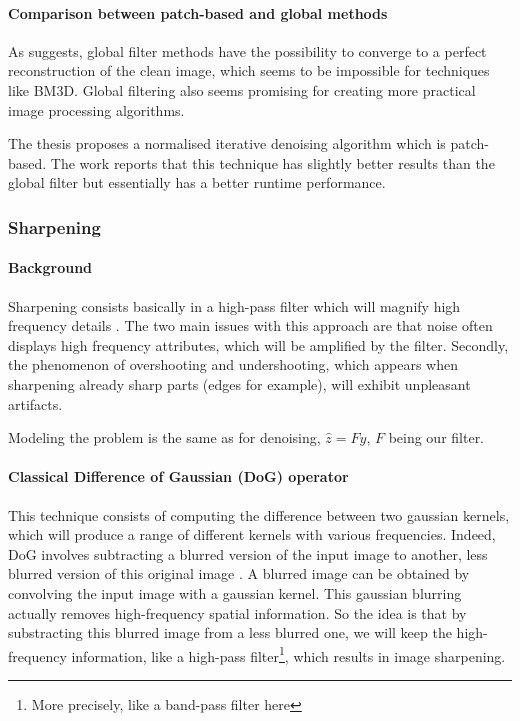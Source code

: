 \paragraph{Comparison between patch-based and global methods}
As \cite{talebi_asymptotic_2016} suggests, global filter methods have the possibility to converge to a perfect reconstruction of the clean image, which seems to be impossible for techniques like BM3D.
Global filtering also seems promising for creating more practical image processing algorithms.

The thesis \cite{kheradmand_graph-based_2016} proposes a normalised iterative denoising algorithm which is patch-based.
The work reports that this technique has slightly better results than the global filter but essentially has a better runtime performance.

\subsubsection{Sharpening}

\paragraph{Background}
Sharpening consists basically in a high-pass filter which will magnify high frequency details \cite{kheradmand_graph-based_2016}.
The two main issues with this approach are that noise often displays high frequency attributes, which will be amplified by the filter.
Secondly, the phenomenon of overshooting and undershooting, which appears when sharpening already sharp parts (edges for example), will exhibit unpleasant artifacts.

Modeling the problem is the same as for denoising, \(\hat{z} = Fy\), \(F\) being our filter.

\paragraph{Classical Difference of Gaussian (DoG) operator}
This technique consists of computing the difference between two gaussian kernels, which will produce a range of different kernels with various frequencies.
Indeed, DoG involves subtracting a blurred version of the input image to another, less blurred version of this original image \cite{wiki:Difference_of_Gaussians}.
A blurred image can be obtained by convolving the input image with a gaussian kernel.
This gaussian blurring actually removes high-frequency spatial information.
So the idea is that by substracting this blurred image from a less blurred one, we will keep the high-frequency information, like a high-pass filter\footnote{More precisely, like a band-pass filter here}, which results in image sharpening.

